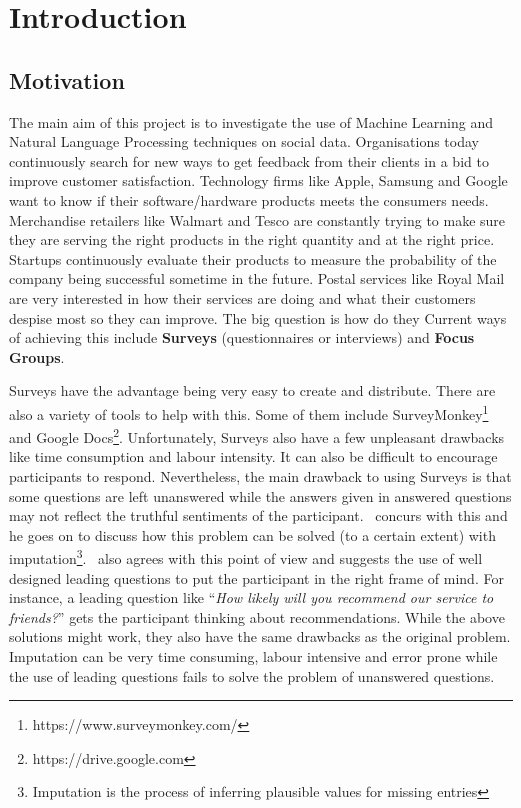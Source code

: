 
\chapter{Introduction}
\label{cha:introduction}

\section{Motivation}
\label{sec:motivation}
The main aim of this project is to investigate the use of Machine Learning and Natural Language
Processing techniques on social data. Organisations today continuously search for new ways to get
feedback from their clients in a bid to improve customer satisfaction. Technology firms like Apple,
Samsung and Google want to know if their software/hardware products meets the consumers needs.
Merchandise retailers like Walmart and Tesco are constantly trying to make sure they are serving the
right products in the right quantity and at the right price. Startups continuously evaluate their
products to measure the probability of the company being successful sometime in the future. Postal
services like Royal Mail are very interested in how their services are doing and what their
customers despise most so they can improve. The big question is how do they Current ways of
achieving this include \textbf{Surveys} (questionnaires or interviews) and \textbf{Focus Groups}.

Surveys have the advantage being very easy to create and distribute. There are also a variety of
tools to help with this. Some of them include SurveyMonkey\footnote{https://www.surveymonkey.com/}
and Google Docs\footnote{https://drive.google.com}. Unfortunately, Surveys also have a few
unpleasant drawbacks like time consumption and labour intensity. It can also be difficult to
encourage participants to respond. Nevertheless, the main drawback to using Surveys is that some
questions are left unanswered while the answers given in answered questions may not reflect the
truthful sentiments of the participant.~\cite{DonaldBRubin1987} concurs with this and he goes on to
discuss how this problem can be solved (to a certain extent) with imputation\footnote{Imputation is
the process of inferring plausible values for missing entries}.~\cite{BobEHayes2008} also agrees
with this point of view and suggests the use of well designed leading questions to put the
participant in the right frame of mind. For instance, a leading question like ``\textit{How likely
will you recommend our service to friends?}'' gets the participant thinking about recommendations.
While the above solutions might work, they also have the same drawbacks as the original problem.
Imputation can be very time consuming, labour intensive and error prone while the use of leading
questions fails to solve the problem of unanswered questions.

